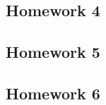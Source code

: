 \newcommand{\pd}[2]{\frac{\partial #1}{\partial #2}}
\newcommand{\pdd}[2]{\frac{\partial^2 #1}{\partial #2^2}}
\newcommand{\diff}{\mathrm{d}}
\newcommand{\sme}{\epsilon}
\newcommand{\hvkt}{e^{-hv/kT}}
\newcommand{\dd}[2]{\frac{\diff #1}{\diff #2}}


\subsection*{Homework 4}
\begin{enumerate}
    
\end{enumerate}

\subsection*{Homework 5}
\begin{enumerate}
    
\end{enumerate}

\subsection*{Homework 6}
\begin{enumerate}
    
\end{enumerate}

